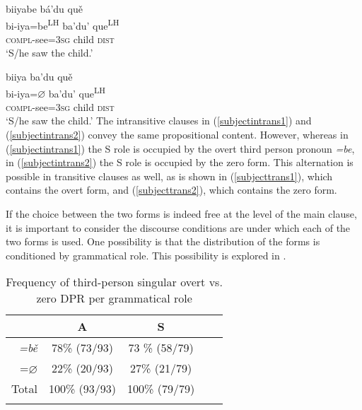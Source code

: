 \ea \label{subjecttrans1} 
\glll biiyabe b\'{a}'du qu\v{e}  \\
bi-iya=be\textsuperscript{LH} ba'du' que\textsuperscript{LH}  \\
\textsc{compl}-see=3\textsc{sg} child \textsc{dist}  \\
\glt `S/he saw the child.' 
\z

\ea \label{subjecttrans2} 
\glll biiya ba'du qu\v{e} \\
bi-iya=$\varnothing$ ba'du' que\textsuperscript{LH} \\
\textsc{compl}-see=3\textsc{sg} child \textsc{dist} \\
\glt `S/he saw the child.' 
\z
The intransitive clauses in (\ref{subjectintrans1}) and (\ref{subjectintrans2}) convey the same propositional content. However, whereas in (\ref{subjectintrans1}) the S role is occupied by the overt third person pronoun \textit{=be}, in (\ref{subjectintrans2}) the S role is occupied by the zero form. This alternation is possible in transitive clauses as well, as is shown in (\ref{subjecttrans1}), which contains the overt form, and (\ref{subjecttrans2}), which contains the zero form. 

If the choice between the two forms is indeed free at the level of the main clause, it is important to consider the discourse conditions are under which each of the two forms is used. One possibility is that the distribution of the forms is conditioned by grammatical role. This possibility is explored in .

\begin{table}

\caption{{Frequency of third-person singular overt vs. zero DPR per grammatical role}}
\begin{tabular}{ r  c  c  c  c }
\lsptoprule
 & A & S \\

\midrule
\textit{=b\v{e}} &  78{\%} (73/93) & 73 {\%} (58/79) \\

\textsc{=$\varnothing$} &  22{\%} (20/93)  &  27{\%} (21/79) \\

\midrule
Total&  100{\%} (93/93) &  100{\%} (79/79)  \\

\lspbottomrule
\end{tabular}\\
\label{overtvszero}

\end{table}


